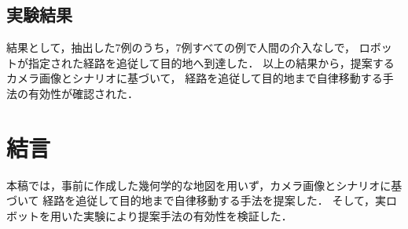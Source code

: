 \documentclass{sice-si}
\begin{document}

\subsection{実験結果}
結果として，抽出した7例のうち，7例すべての例で人間の介入なしで，
ロボットが指定された経路を追従して目的地へ到達した．
以上の結果から，提案するカメラ画像とシナリオに基づいて，
経路を追従して目的地まで自律移動する手法の有効性が確認された．


\section{結言}
本稿では，事前に作成した幾何学的な地図を用いず，カメラ画像とシナリオに基づいて
経路を追従して目的地まで自律移動する手法を提案した．
そして，実ロボットを用いた実験により提案手法の有効性を検証した．
\end{document}
